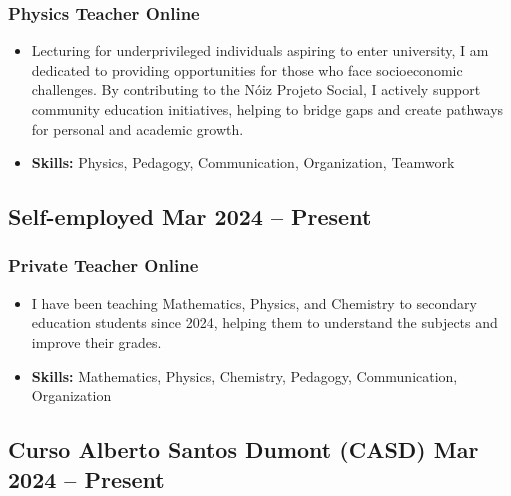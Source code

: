 \documentclass[11pt]{article}
\begin{document}
\subsubsection{ Physics Teacher \hfill Online }
\vspace{10pt} %
\begin{itemize}
    \item Lecturing for underprivileged individuals aspiring to enter university, I am dedicated to providing opportunities for those who face socioeconomic challenges. By contributing to the Nóiz Projeto Social, I actively support community education initiatives, helping to bridge gaps and create pathways for personal and academic growth.
    
    \item \textbf{Skills:}  Physics, Pedagogy, Communication, Organization, Teamwork
    
\end{itemize}

\subsection{ Self-employed \hfill  Mar 2024  -- Present   }
\subsubsection{ Private Teacher \hfill Online }
\vspace{10pt} %
\begin{itemize}
    \item I have been teaching Mathematics, Physics, and Chemistry to secondary education students since 2024, helping them to understand the subjects and improve their grades.
    
    \item \textbf{Skills:}  Mathematics, Physics, Chemistry, Pedagogy, Communication, Organization
    
\end{itemize}

\subsection{ Curso Alberto Santos Dumont (CASD) \hfill  Mar 2024  -- Present   }
\end{document}
